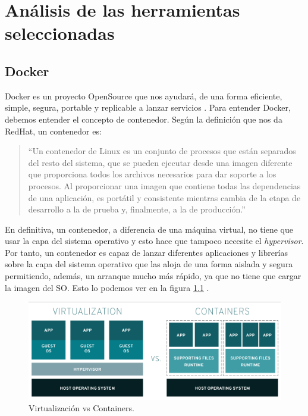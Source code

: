 \chapter{Análisis de las herramientas seleccionadas \label{propuesta}}


\section{Docker\label{Docker}}


Docker es un proyecto OpenSource que nos ayudará, de una forma eficiente,
simple, segura, portable y replicable a lanzar servicios
\cite{Dck-5,Dck-6}. Para entender Docker, debemos entender el concepto de
contenedor. Según la definición que nos da RedHat, un contenedor es:

\begin{quote}

  \small ``Un contenedor de Linux es un conjunto de procesos que están
  separados del resto del sistema, que se pueden ejecutar desde una imagen
  diferente que proporciona todos los archivos necesarios para dar soporte
  a los procesos. Al proporcionar una imagen que contiene todas las
  dependencias de una aplicación, es portátil y consistente mientras cambia
  de la etapa de desarrollo a la de prueba y, finalmente, a la de
  producción.''\cite{Dck-7}

\end{quote}

En definitiva, un contenedor, a diferencia de una máquina virtual, no tiene
que usar la capa del sistema operativo y esto hace que tampoco necesite el
{\em hypervisor}. Por tanto, un contenedor es capaz de lanzar diferentes
aplicaciones y librerías sobre la capa del sistema operativo que las aloja
de una forma aislada y segura permitiendo, además, un arranque mucho más
rápido, ya que no tiene que cargar la imagen del SO. Esto lo podemos ver en
la figura \ref{dock-1} \cite{Dck-7}.

\begin{figure}[htp]
\centering
\includegraphics[scale=0.45]{Imagenes/dockervsvm1.png}
\caption{Virtualización vs Containers.}
\label{dock-1}
\end{figure}

